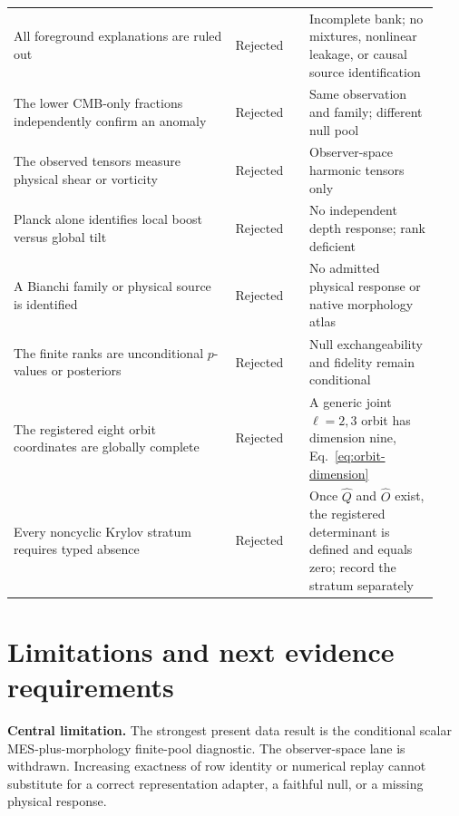 \documentclass[11pt,a4paper]{article}
\newenvironment{warningbox}
  {\begin{center}\begin{minipage}{0.95\linewidth}\raggedright\color{warningbrown}}
  {\end{minipage}\end{center}}
\begin{document}
\begin{longtable}{@{}p{0.48\linewidth}p{0.16\linewidth}p{0.29\linewidth}@{}}
All foreground explanations are ruled out & Rejected & Incomplete bank; no
mixtures, nonlinear leakage, or causal source identification\\
The lower CMB-only fractions independently confirm an anomaly & Rejected &
Same observation and family; different null pool\\
The observed tensors measure physical shear or vorticity & Rejected &
Observer-space harmonic tensors only\\
Planck alone identifies local boost versus global tilt & Rejected & No
independent depth response; rank deficient\\
A Bianchi family or physical source is identified & Rejected & No admitted
physical response or native morphology atlas\\
The finite ranks are unconditional $p$-values or posteriors & Rejected & Null
exchangeability and fidelity remain conditional\\
The registered eight orbit coordinates are globally complete & Rejected & A
generic joint $\ell=2,3$ orbit has dimension nine, Eq.~\eqref{eq:orbit-dimension}\\
Every noncyclic Krylov stratum requires typed absence & Rejected & Once
$\widehat Q$ and $\widehat O$ exist, the registered determinant is defined and
equals zero; record the stratum separately\\
\bottomrule
\end{longtable}

\clearpage
\section{Limitations and next evidence requirements}

\begin{warningbox}
\textbf{Central limitation.}
The strongest present data result is the conditional scalar MES-plus-morphology
finite-pool diagnostic.  The observer-space lane is withdrawn.  Increasing
exactness of row identity or numerical replay cannot substitute for a correct
representation adapter, a faithful null, or a missing physical response.
\end{warningbox}
\end{document}
